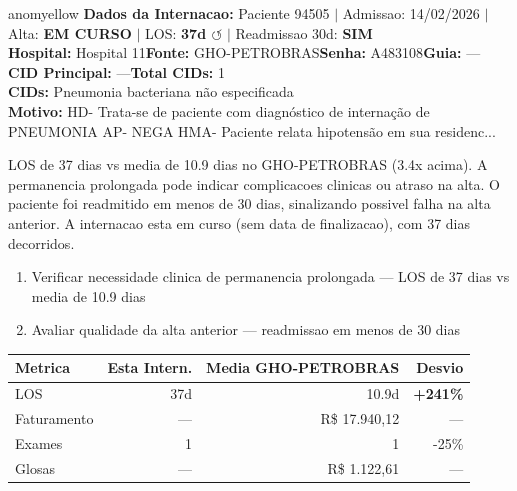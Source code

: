 \documentclass[a4paper,10pt]{article}
\begin{document}
\begin{anomalycard}[Internacao 165511 | GHO-PETROBRAS | MODERADO (z=2.09)]{anomyellow}
\textbf{Dados da Internacao:} Paciente 94505 $\mid$ Admissao: 14/02/2026 $\mid$ Alta: \textcolor{anomorange}{\textbf{EM CURSO}} $\mid$ LOS: \textbf{37d \textcolor{anomorange}{$\circlearrowleft$}} $\mid$ Readmissao 30d: \textcolor{anomred}{\textbf{SIM}}\\
\textbf{Hospital:} Hospital 11\quad\textbf{Fonte:} GHO-PETROBRAS\quad\textbf{Senha:} A483108\quad\textbf{Guia:} ---\\
\textbf{CID Principal:} {\small ---}\quad\textbf{Total CIDs:} 1\\

\textbf{CIDs:} {\scriptsize Pneumonia bacteriana não especificada}\\

\textbf{Motivo:} {\scriptsize HD- Trata-se de paciente com diagnóstico de internação de PNEUMONIA  AP- NEGA  HMA- Paciente relata hipotensão em sua residenc...}\\

\vspace{2pt}\begin{tcolorbox}[colback=severityred!20,colframe=anomyellow,title={\textbf{Interpretacao de Negocio}},fonttitle=\bfseries\small,left=4pt,right=4pt,top=3pt,bottom=3pt]
{\small LOS de 37 dias vs media de 10.9 dias no GHO-PETROBRAS (3.4x acima). A permanencia prolongada pode indicar complicacoes clinicas ou atraso na alta. O paciente foi readmitido em menos de 30 dias, sinalizando possivel falha na alta anterior. A internacao esta em curso (sem data de finalizacao), com 37 dias decorridos.}
\end{tcolorbox}
\begin{tcolorbox}[colback=severityyellow!30,colframe=anomorange,title={\textbf{Recomendacoes Especificas}},fonttitle=\bfseries\small,left=4pt,right=4pt,top=3pt,bottom=3pt]
\begin{enumerate}[nosep,leftmargin=16pt]
\item {\small Verificar necessidade clinica de permanencia prolongada --- LOS de 37 dias vs media de 10.9 dias}
\item {\small Avaliar qualidade da alta anterior --- readmissao em menos de 30 dias}
\end{enumerate}
\end{tcolorbox}
\begin{center}\begin{tabular}{l r r r}\toprule\textbf{Metrica} & \textbf{Esta Intern.} & \textbf{Media GHO-PETROBRAS} & \textbf{Desvio} \\\midrule
LOS & 37d & 10.9d & \textcolor{anomred}{\textbf{+241\%}} \\
Faturamento & --- & R\$ 17.940,12 & --- \\
Exames & 1 & 1 & -25\% \\
Glosas & --- & R\$ 1.122,61 & --- \\
\bottomrule\end{tabular}\end{center}


\end{anomalycard}
\end{document}
